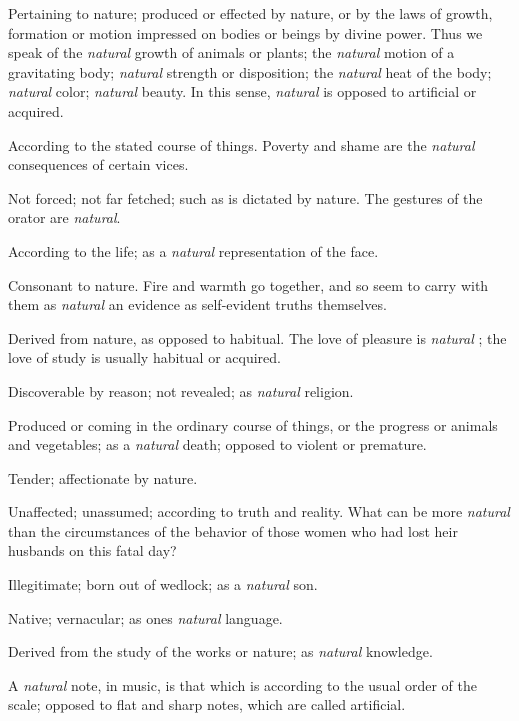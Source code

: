 	\begin{compactitem}
		\item[1] Pertaining to nature; produced or effected by nature, or by the laws of growth, formation or motion impressed on bodies or beings by divine power. Thus we speak of the \textit{natural} growth of animals or plants; the \textit{natural} motion of a gravitating body; \textit{natural} strength or disposition; the \textit{natural} heat of the body; \textit{natural} color; \textit{natural} beauty. In this sense, \textit{natural} is opposed to artificial or acquired.
		\item[2] According to the stated course of things. Poverty and shame are the \textit{natural} consequences of certain vices.
		\item[3] Not forced; not far fetched; such as is dictated by nature. The gestures of the orator are \textit{natural}.
		\item[4] According to the life; as a \textit{natural} representation of the face. 
		\item[5] Consonant to nature. Fire and warmth go together, and so seem to carry with them as \textit{natural} an evidence as self-evident truths themselves.
		\item[6] Derived from nature, as opposed to habitual. The love of pleasure is \textit{natural} ; the love of study is usually habitual or acquired.
		\item[7] Discoverable by reason; not revealed; as \textit{natural} religion.
		\item[8] Produced or coming in the ordinary course of things, or the progress or animals and vegetables; as a \textit{natural} death; opposed to violent or premature.
		\item[9] Tender; affectionate by nature.
		\item[10] Unaffected; unassumed; according to truth and reality. What can be more \textit{natural} than the circumstances of the behavior of those women who had lost heir husbands on this fatal day?
		\item[11] Illegitimate; born out of wedlock; as a \textit{natural} son.
		\item[12] Native; vernacular; as ones \textit{natural} language.
		\item[13] Derived from the study of the works or nature; as \textit{natural} knowledge.
		\item[14] A \textit{natural} note, in music, is that which is according to the usual order of the scale; opposed to flat and sharp notes, which are called artificial.
	\end{compactitem}

